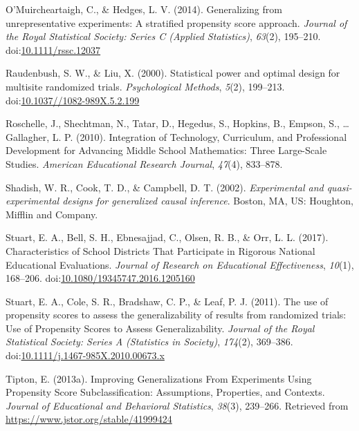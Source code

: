 \documentclass[man,floatsintext]{apa6}
\begin{document}
\leavevmode\hypertarget{ref-omuircheartaighGeneralizingUnrepresentativeExperiments2014}{}%
O'Muircheartaigh, C., \& Hedges, L. V. (2014). Generalizing from unrepresentative experiments: A stratified propensity score approach. \emph{Journal of the Royal Statistical Society: Series C (Applied Statistics)}, \emph{63}(2), 195--210. doi:\href{https://doi.org/10.1111/rssc.12037}{10.1111/rssc.12037}

\leavevmode\hypertarget{ref-raudenbushStatisticalPowerOptimal2000}{}%
Raudenbush, S. W., \& Liu, X. (2000). Statistical power and optimal design for multisite randomized trials. \emph{Psychological Methods}, \emph{5}(2), 199--213. doi:\href{https://doi.org/10.1037//1082-989X.5.2.199}{10.1037//1082-989X.5.2.199}

\leavevmode\hypertarget{ref-roschelleIntegrationTechnologyCurriculum2010}{}%
Roschelle, J., Shechtman, N., Tatar, D., Hegedus, S., Hopkins, B., Empson, S., \ldots{} Gallagher, L. P. (2010). Integration of Technology, Curriculum, and Professional Development for Advancing Middle School Mathematics: Three Large-Scale Studies. \emph{American Educational Research Journal}, \emph{47}(4), 833--878.

\leavevmode\hypertarget{ref-shadishExperimentalQuasiexperimentalDesigns2002}{}%
Shadish, W. R., Cook, T. D., \& Campbell, D. T. (2002). \emph{Experimental and quasi-experimental designs for generalized causal inference}. Boston, MA, US: Houghton, Mifflin and Company.

\leavevmode\hypertarget{ref-stuartCharacteristicsSchoolDistricts2017}{}%
Stuart, E. A., Bell, S. H., Ebnesajjad, C., Olsen, R. B., \& Orr, L. L. (2017). Characteristics of School Districts That Participate in Rigorous National Educational Evaluations. \emph{Journal of Research on Educational Effectiveness}, \emph{10}(1), 168--206. doi:\href{https://doi.org/10.1080/19345747.2016.1205160}{10.1080/19345747.2016.1205160}

\leavevmode\hypertarget{ref-stuartUsePropensityScores2011}{}%
Stuart, E. A., Cole, S. R., Bradshaw, C. P., \& Leaf, P. J. (2011). The use of propensity scores to assess the generalizability of results from randomized trials: Use of Propensity Scores to Assess Generalizability. \emph{Journal of the Royal Statistical Society: Series A (Statistics in Society)}, \emph{174}(2), 369--386. doi:\href{https://doi.org/10.1111/j.1467-985X.2010.00673.x}{10.1111/j.1467-985X.2010.00673.x}

\leavevmode\hypertarget{ref-tiptonImprovingGeneralizationsExperiments2013}{}%
Tipton, E. (2013a). Improving Generalizations From Experiments Using Propensity Score Subclassification: Assumptions, Properties, and Contexts. \emph{Journal of Educational and Behavioral Statistics}, \emph{38}(3), 239--266. Retrieved from \url{https://www.jstor.org/stable/41999424}
\end{document}
